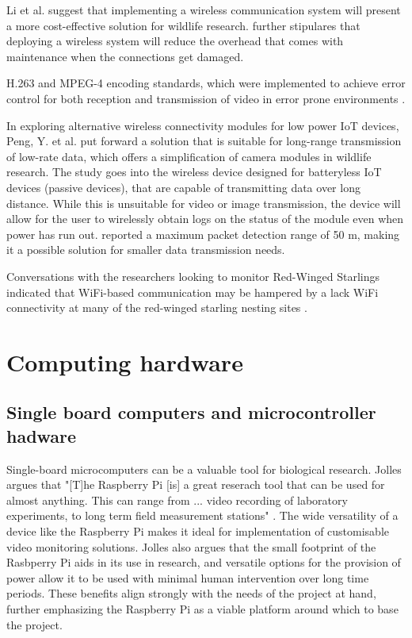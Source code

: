 \documentclass[class=report,11pt,crop=false]{standalone}
\begin{document}
Li et al. \cite{li2010design} suggest that implementing a wireless communication system will present a more cost-effective solution for wildlife research.  \cite{li2010design} further stipulares that deploying a wireless system will reduce the overhead that comes with maintenance when the connections get damaged.

\cite{adsumilli2002adaptive} H.263 and MPEG-4 encoding standards, which were implemented to achieve error control for both reception and transmission of video in error prone environments \cite{adsumilli2002adaptive}.

In exploring alternative wireless connectivity modules for low power IoT devices, Peng, Y. et al. \cite{peng2018plora} put forward a solution that is suitable for long-range transmission of low-rate data, which offers a simplification of camera modules in wildlife research. The study goes into the wireless device designed for batteryless IoT devices (passive devices), that are capable of transmitting data over long distance. While this is unsuitable for video or image transmission, the device will allow for the user to wirelessly obtain logs on the status of the module even when power has run out. \cite{peng2018plora} reported a maximum packet detection range of 50 m, making it a possible solution for smaller data transmission needs. %

Conversations with the researchers looking to monitor Red-Winged Starlings indicated that WiFi-based communication may be hampered by a lack WiFi connectivity at many of the red-winged starling nesting sites \cite{hofmeyer2024private}.

\section{Computing hardware}

\subsection{Single board computers and microcontroller hadware}

Single-board microcomputers can be a valuable tool for biological research. Jolles argues that "[T]he Raspberry Pi [is] a great reserach tool that can be used for almost anything. This can range from ... video recording of laboratory experiments, to long term field measurement stations" \cite{jolles2021broad-scale}. The wide versatility of a device like the Raspberry Pi makes it ideal for implementation of customisable video monitoring solutions. Jolles \cite{jolles2021broad-scale} also argues that the small footprint of the Rasbperry Pi aids in its use in research, and versatile options for the provision of power allow it to be used with minimal human intervention over long time periods. These benefits align strongly with the needs of the project at hand, further emphasizing the Raspberry Pi as a viable platform around which to base the project.
\end{document}
